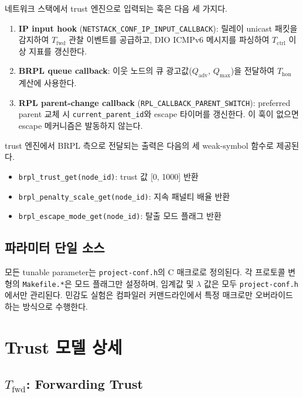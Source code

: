 \documentclass[12pt,a4paper]{article}
\begin{document}
네트워크 스택에서 trust 엔진으로 입력되는 훅은 다음 세 가지다.
\begin{enumerate}
  \item \textbf{IP input hook} (\texttt{NETSTACK\_CONF\_IP\_INPUT\_CALLBACK}):  
  릴레이 unicast 패킷을 감지하여 $T_\text{fwd}$ 관찰 이벤트를 공급하고,
  DIO ICMPv6 메시지를 파싱하여 $T_\text{ctrl}$ 이상 지표를 갱신한다.
  \item \textbf{BRPL queue callback}:  
  이웃 노드의 큐 광고값($Q_\text{adv}$, $Q_\text{max}$)을 전달하여
  $T_\text{hon}$ 계산에 사용한다.
  \item \textbf{RPL parent-change callback}
  (\texttt{RPL\_CALLBACK\_PARENT\_SWITCH}):  
  preferred parent 교체 시 \texttt{current\_parent\_id}와 escape 타이머를 갱신한다.
  이 훅이 없으면 escape 메커니즘은 발동하지 않는다.
\end{enumerate}

trust 엔진에서 BRPL 측으로 전달되는 출력은 다음의 세 weak-symbol 함수로 제공된다.
\begin{itemize}
  \item \texttt{brpl\_trust\_get(node\_id)}: trust 값 [0, 1000] 반환
  \item \texttt{brpl\_penalty\_scale\_get(node\_id)}: 지속 패널티 배율 반환
  \item \texttt{brpl\_escape\_mode\_get(node\_id)}: 탈출 모드 플래그 반환
\end{itemize}

\subsection{파라미터 단일 소스}

모든 tunable parameter는 \texttt{project-conf.h}의 C 매크로로 정의된다.
각 프로토콜 변형의 \texttt{Makefile.*}은 모드 플래그만 설정하며,
임계값 및 $\lambda$ 값은 모두 \texttt{project-conf.h}에서만 관리된다.
민감도 실험은 컴파일러 커맨드라인에서 특정 매크로만 오버라이드하는 방식으로 수행한다.

\section{Trust 모델 상세}

\subsection{$T_\text{fwd}$: Forwarding Trust}
\end{document}

